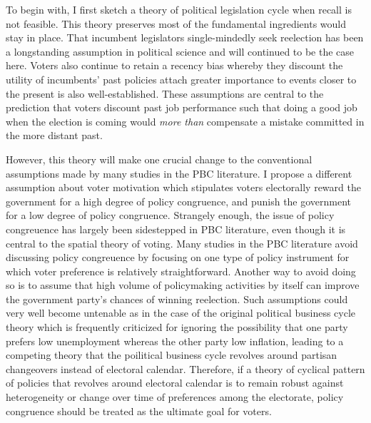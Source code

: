 \documentclass[hyphens, crop=false]{standalone}
\begin{document}
	
	To begin with,
	I first sketch a theory of political legislation cycle
	when recall is not feasible.
	This theory
	preserves
	most of the fundamental ingredients would stay in place.
	That incumbent legislators single-mindedly seek reelection
	has been a longstanding assumption in political science
	and will continued to be the case here.
	Voters also continue to
	retain a recency bias whereby they
	discount the utility of incumbents' past policies
	attach greater importance to events
	closer to the present
	is also well-established.
	These assumptions are central to the
	prediction that voters discount 
	past job performance
	such that doing a good job when the election is coming
	would \textit{more than} compensate
	a mistake committed in the more distant past.
	
	
	
	However,
	this theory will make one crucial change
	to the conventional assumptions made
	by many studies in the PBC literature.
	I propose a different assumption about voter motivation
	which stipulates
	voters electorally reward the government 
	for a high degree of policy congruence,
	and punish the government
	for a low degree of policy congruence.
	Strangely enough,
	the issue of policy congreuence
	has largely been sidestepped
	in PBC literature,
	even though it is
	central to the
	spatial theory of voting.
	Many studies
	in the PBC literature
	avoid discussing policy congreuence
	by focusing on one type of policy instrument
	for which voter preference is relatively straightforward.
	Another way to avoid doing so
	is to assume that high volume of policymaking activities
	by itself can improve the government party's chances of
	winning reelection.
	Such assumptions could very well become untenable
	as in the case of the original political business cycle theory
	which is frequently criticized for ignoring the possibility that
	one party prefers low unemployment whereas the other party low inflation,
	leading to a competing theory that the poilitical business cycle
	revolves around partisan changeovers
	instead of electoral calendar.
	Therefore,
	if a theory of cyclical pattern of policies
	that revolves around electoral calendar is to remain
	robust against heterogeneity or change over time of preferences among the electorate,
	policy congruence should be treated as the ultimate
	goal for voters.
	
	
\end{document}
